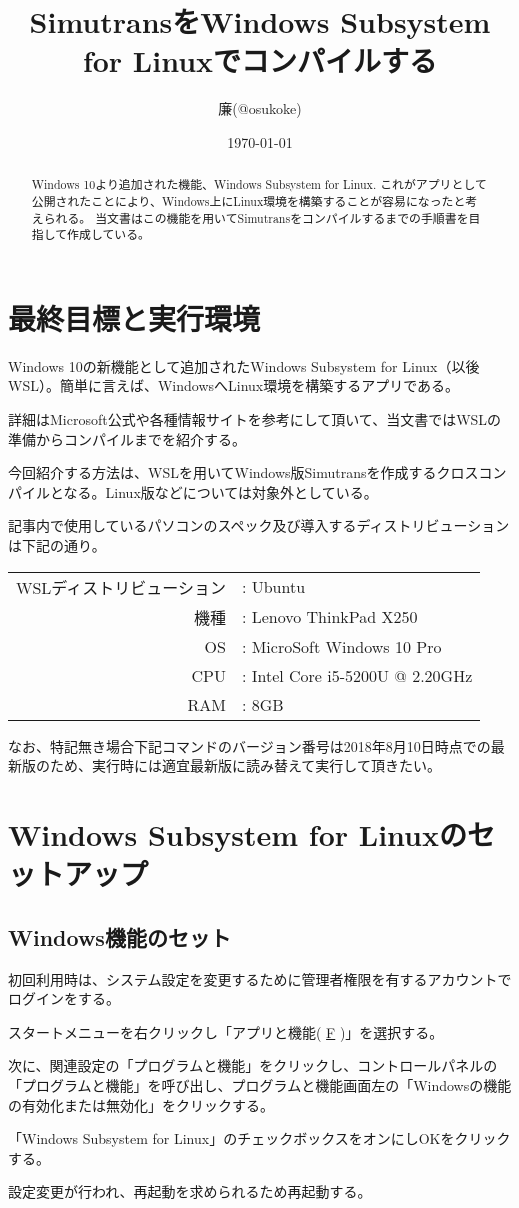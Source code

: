 \documentclass[autodetect-engine,dvipdfmx-if-dvi,ja=standard,a4j]{bxjsarticle}
\title{SimutransをWindows Subsystem for Linuxでコンパイルする}
\author{廉(@osukoke)}
\date{\today}
\begin{document}
	\maketitle
	\begin{abstract}
		Windows 10より追加された機能、Windows Subsystem for Linux.
		これがアプリとして公開されたことにより、Windows上にLinux環境を構築することが容易になったと考えられる。
		当文書はこの機能を用いてSimutransをコンパイルするまでの手順書を目指して作成している。
	\end{abstract}
	\section{最終目標と実行環境}
		Windows 10の新機能として追加されたWindows Subsystem for Linux（以後WSL）。簡単に言えば、WindowsへLinux環境を構築するアプリである。\par \noindent
		詳細はMicrosoft公式や各種情報サイトを参考にして頂いて、当文書ではWSLの準備からコンパイルまでを紹介する。\par
		今回紹介する方法は、WSLを用いてWindows版Simutransを作成するクロスコンパイルとなる。Linux版などについては対象外としている。\par
		記事内で使用しているパソコンのスペック及び導入するディストリビューションは下記の通り。\par\noindent
		\begin{center}	
			\begin{tabular}{rl}
				WSLディストリビューション & : Ubuntu\\
				機種 & : Lenovo ThinkPad X250\\
				OS & : MicroSoft Windows 10 Pro\\
				CPU & : Intel Core i5-5200U @ 2.20GHz\\
				RAM & : 8GB\\
			\end{tabular}
		\end{center}
	\par
		なお、特記無き場合下記コマンドのバージョン番号は2018年8月10日時点での最新版のため、実行時には適宜最新版に読み替えて実行して頂きたい。\par
	\section{Windows Subsystem for Linuxのセットアップ}
		\subsection{Windows機能のセット}
			初回利用時は、システム設定を変更するために管理者権限を有するアカウントでログインをする。\par\noindent
			スタートメニューを右クリックし「アプリと機能( \underline{F} )」を選択する。\par
			次に、関連設定の「プログラムと機能」をクリックし、コントロールパネルの「プログラムと機能」を呼び出し、プログラムと機能画面左の「Windowsの機能の有効化または無効化」をクリックする。\par\noindent
			「Windows Subsystem for Linux」のチェックボックスをオンにしOKをクリックする。\par
			設定変更が行われ、再起動を求められるため再起動する。
\end{document}
